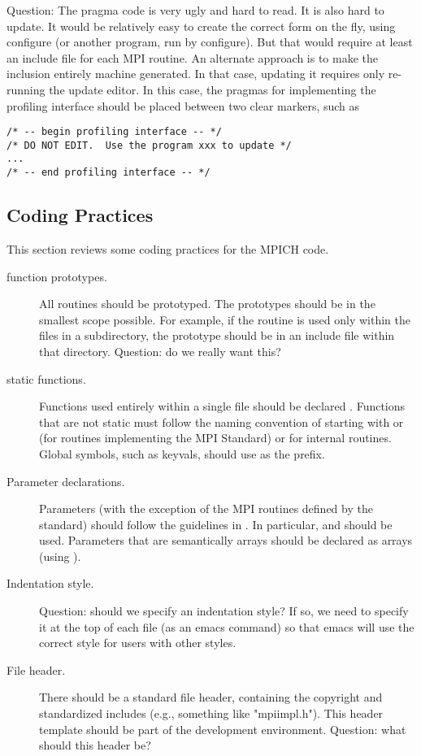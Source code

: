 \documentclass{article}
\begin{document}
Question: The pragma code is very ugly and hard to read.  It is also hard to
update.
It would be relatively
easy to create the correct form on the fly, using configure (or
another program, run by configure).  But that
would require at least an include file for each MPI routine.
An alternate approach is to make the inclusion entirely machine
generated.  In that case, updating it requires only re-running the
update editor.  In this case, the pragmas for implementing the
profiling interface should be placed between two clear markers, such
as 
\begin{verbatim}
/* -- begin profiling interface -- */
/* DO NOT EDIT.  Use the program xxx to update */
...
/* -- end profiling interface -- */
\end{verbatim}

\subsection{Coding Practices}
This section reviews some coding practices for the MPICH code.

\begin{description}
\item[function prototypes.]
All routines should be prototyped.  The prototypes should be in the
smallest scope possible.  For example, if the routine is used only
within the files in a subdirectory, the prototype should be in an
include file within that directory.
Question: do we really want this?

\item[static functions.]
Functions used entirely within a single file should be declared
.  Functions that are not static must follow the naming
convention of starting with  or  (for routines
implementing the MPI Standard) or  for internal routines.  
Global symbols, such as keyvals, should use  as the
prefix.  

\item[Parameter declarations.]
Parameters (with the exception of the MPI routines defined by the
standard) should follow the guidelines in .  In
particular,  and  should be used.
Parameters that are semantically arrays should be declared as arrays
(using \code{[]}).  

\item[Indentation style.]
Question: should we specify an indentation style?  If so, we need to
specify it at the top of each file (as an emacs command) so that emacs
will use the correct style for users with other styles.

\item[File header.]
There should be a standard file header, containing the copyright and
standardized includes (e.g., something like "mpiimpl.h").  This header
template should be part of the development environment.  Question:
what should this header be?

\end{description}
\end{document}
